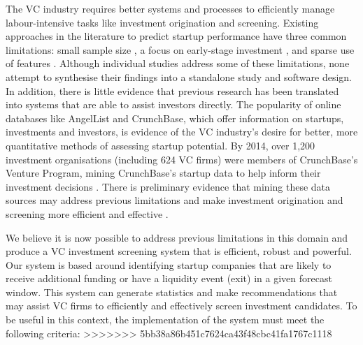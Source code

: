 \documentclass[../thesis/thesis.tex]{subfiles}
\begin{document}
The VC industry requires better systems and processes to efficiently manage labour-intensive tasks like investment origination and screening. Existing approaches in the literature to predict startup performance have three common limitations: small sample size \cite{ahlers2015, gimmon2010, dixon2014, hoenen2014, yu2015, an2015, werth2013, croce2016}, a focus on early-stage investment \cite{beckwith2016, ahlers2015, cheng2016, yuan2016, croce2016}, and sparse use of features \cite{ahlers2015, an2015, cheng2016, croce2016, werth2013, gimmon2010}. Although individual studies address some of these limitations, none attempt to synthesise their findings into a standalone study and software design. In addition, there is little evidence that previous research has been translated into systems that are able to assist investors directly. The popularity of online databases like AngelList and CrunchBase, which offer information on startups, investments and investors, is evidence of the VC industry’s desire for better, more quantitative methods of assessing startup potential. By 2014, over 1,200 investment organisations (including 624 VC firms) were members of CrunchBase's Venture Program, mining CrunchBase's startup data to help inform their investment decisions \cite{patil2015}. There is preliminary evidence that mining these data sources may address previous limitations and make investment origination and screening more efficient and effective \cite{stone2014,bhat2011}.

We believe it is now possible to address previous limitations in this domain and produce a VC investment screening system that is efficient, robust and powerful. Our system is based around identifying startup companies that are likely to receive additional funding or have a liquidity event (exit) in a given forecast window. This system can generate statistics and make recommendations that may assist VC firms to efficiently and effectively screen investment candidates. To be useful in this context, the implementation of the system must meet the following criteria:
>>>>>>> 5bb38a86b451c7624ca43f48cbc41fa1767c1118
\end{document}
